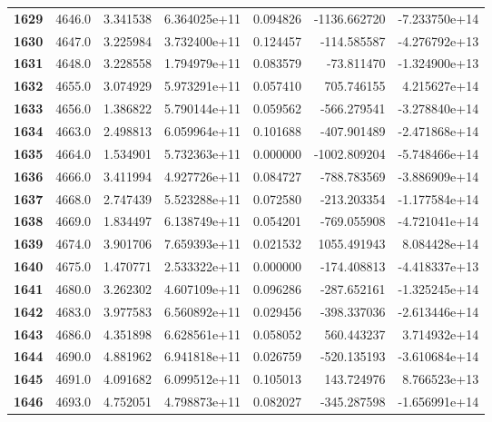 \documentclass{report}[12pt]
\begin{document}
\begin{center}
\begin{tabular}{lrrrrrr}
\textbf{1629} &         4646.0 &   3.341538 &  6.364025e+11 &    0.094826 & -1136.662720 & -7.233750e+14 \\
\textbf{1630} &         4647.0 &   3.225984 &  3.732400e+11 &    0.124457 &  -114.585587 & -4.276792e+13 \\
\textbf{1631} &         4648.0 &   3.228558 &  1.794979e+11 &    0.083579 &   -73.811470 & -1.324900e+13 \\
\textbf{1632} &         4655.0 &   3.074929 &  5.973291e+11 &    0.057410 &   705.746155 &  4.215627e+14 \\
\textbf{1633} &         4656.0 &   1.386822 &  5.790144e+11 &    0.059562 &  -566.279541 & -3.278840e+14 \\
\textbf{1634} &         4663.0 &   2.498813 &  6.059964e+11 &    0.101688 &  -407.901489 & -2.471868e+14 \\
\textbf{1635} &         4664.0 &   1.534901 &  5.732363e+11 &    0.000000 & -1002.809204 & -5.748466e+14 \\
\textbf{1636} &         4666.0 &   3.411994 &  4.927726e+11 &    0.084727 &  -788.783569 & -3.886909e+14 \\
\textbf{1637} &         4668.0 &   2.747439 &  5.523288e+11 &    0.072580 &  -213.203354 & -1.177584e+14 \\
\textbf{1638} &         4669.0 &   1.834497 &  6.138749e+11 &    0.054201 &  -769.055908 & -4.721041e+14 \\
\textbf{1639} &         4674.0 &   3.901706 &  7.659393e+11 &    0.021532 &  1055.491943 &  8.084428e+14 \\
\textbf{1640} &         4675.0 &   1.470771 &  2.533322e+11 &    0.000000 &  -174.408813 & -4.418337e+13 \\
\textbf{1641} &         4680.0 &   3.262302 &  4.607109e+11 &    0.096286 &  -287.652161 & -1.325245e+14 \\
\textbf{1642} &         4683.0 &   3.977583 &  6.560892e+11 &    0.029456 &  -398.337036 & -2.613446e+14 \\
\textbf{1643} &         4686.0 &   4.351898 &  6.628561e+11 &    0.058052 &   560.443237 &  3.714932e+14 \\
\textbf{1644} &         4690.0 &   4.881962 &  6.941818e+11 &    0.026759 &  -520.135193 & -3.610684e+14 \\
\textbf{1645} &         4691.0 &   4.091682 &  6.099512e+11 &    0.105013 &   143.724976 &  8.766523e+13 \\
\textbf{1646} &         4693.0 &   4.752051 &  4.798873e+11 &    0.082027 &  -345.287598 & -1.656991e+14 \\

\end{tabular}
\end{center}
\end{document}
